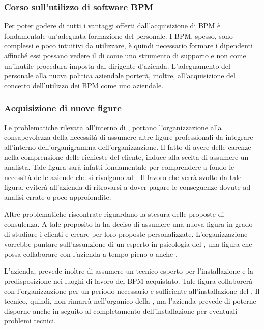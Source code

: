 \subsubsection{Corso sull'utilizzo di software BPM}
Per poter godere di tutti i vantaggi offerti dall'acquisizione di \sw BPM è fondamentale un'adeguata formazione del personale. I \sw BPM, spesso, sono complessi e poco intuitivi da utilizzare, è quindi necessario formare i dipendenti affinché essi possano 
vedere il \sw di  come uno strumento di supporto e non come un'inutile procedura imposta dal dirigente d'azienda.
L'adeguamento del personale alla nuova politica aziendale porterà, inoltre, all'acquisizione del concetto dell'utilizzo dei \sw BPM come uno  aziendale.

\subsubsection{Acquisizione di nuove figure}
Le problematiche rilevata all'interno di \customer , portano l'organizzazione alla consapevolezza della necessità di assumere altre figure professionali da integrare all'interno dell'organigramma dell'organizzazione.
Il fatto di avere delle carenze nella comprensione delle richieste del cliente, induce \customer alla scelta di assumere un analista. Tale figura sarà infatti fondamentale per comprendere a fondo le necessità delle aziende che si rivolgono ad \customer. Il lavoro che verrà svolto da tale figura, eviterà all'azienda di ritrovarsi a dover pagare le conseguenze dovute ad analisi errate o poco approfondite.

Altre problematiche riscontrate riguardano la stesura delle proposte di consulenza. A tale proposito la \customer ha deciso di assumere una nuova figura in grado di studiare i clienti e creare per loro proposte personalizzate. L'organizzazione vorrebbe puntare sull'assunzione di un esperto in psicologia del \mktg , una figura che possa collaborare con l'azienda a tempo pieno o anche .

L'azienda, prevede inoltre di assumere un tecnico esperto per l'installazione e la predisposizione nei luoghi di lavoro del \sw BPM acquistato. Tale figura collaborerà con l'organizzazione per un periodo necessario e sufficiente all'installazione del \sw.
Il tecnico, quindi, non rimarrà nell'organico della \customer , ma l'azienda prevede di poterne disporne anche in seguito al completamento dell'installazione per eventuali problemi tecnici.


